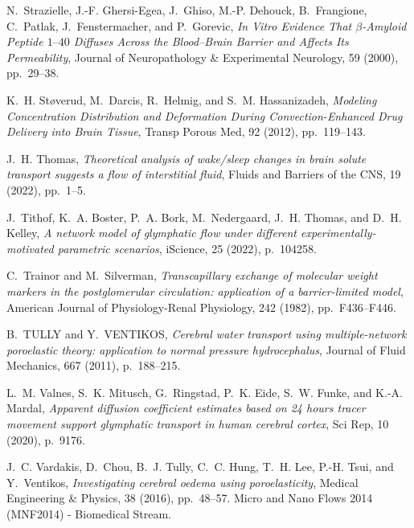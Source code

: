\documentclass[10pt,letterpaper]{article}
\newcommand{\1}{^{(1)}}
\newcommand{\2}{^{(2)}}
\begin{document}
\begin{thebibliography}{10}
{\sc N.~Strazielle, J.-F. Ghersi-Egea, J.~Ghiso, M.-P. Dehouck, B.~Frangione,
  C.~Patlak, J.~Fenstermacher, and P.~Gorevic}, {\em {In Vitro Evidence That
  $\beta$-Amyloid Peptide $1–40$ Diffuses Across the Blood–Brain Barrier
  and Affects Its Permeability}}, Journal of Neuropathology \& Experimental
  Neurology, 59 (2000), pp.~29--38.

{\sc K.~H. Støverud, M.~Darcis, R.~Helmig, and S.~M. Hassanizadeh}, {\em
  Modeling {Concentration} {Distribution} and {Deformation} {During}
  {Convection}-{Enhanced} {Drug} {Delivery} into {Brain} {Tissue}}, Transp
  Porous Med, 92 (2012), pp.~119--143.

{\sc J.~H. Thomas}, {\em Theoretical analysis of wake/sleep changes in brain
  solute transport suggests a flow of interstitial fluid}, Fluids and Barriers
  of the CNS, 19 (2022), pp.~1--5.

{\sc J.~Tithof, K.~A. Boster, P.~A. Bork, M.~Nedergaard, J.~H. Thomas, and
  D.~H. Kelley}, {\em A network model of glymphatic flow under different
  experimentally-motivated parametric scenarios}, iScience, 25 (2022),
  p.~104258.

{\sc C.~Trainor and M.~Silverman}, {\em Transcapillary exchange of molecular
  weight markers in the postglomerular circulation: application of a
  barrier-limited model}, American Journal of Physiology-Renal Physiology, 242
  (1982), pp.~F436--F446.

{\sc B.~TULLY and Y.~VENTIKOS}, {\em Cerebral water transport using
  multiple-network poroelastic theory: application to normal pressure
  hydrocephalus}, Journal of Fluid Mechanics, 667 (2011), p.~188–215.

{\sc L.~M. Valnes, S.~K. Mitusch, G.~Ringstad, P.~K. Eide, S.~W. Funke, and
  K.-A. Mardal}, {\em Apparent diffusion coefficient estimates based on 24
  hours tracer movement support glymphatic transport in human cerebral cortex},
  Sci Rep, 10 (2020), p.~9176.

{\sc J.~C. Vardakis, D.~Chou, B.~J. Tully, C.~C. Hung, T.~H. Lee, P.-H. Tsui,
  and Y.~Ventikos}, {\em Investigating cerebral oedema using poroelasticity},
  Medical Engineering \& Physics, 38 (2016), pp.~48--57.
\newblock Micro and Nano Flows 2014 (MNF2014) - Biomedical Stream.


\end{thebibliography}
\end{document}
